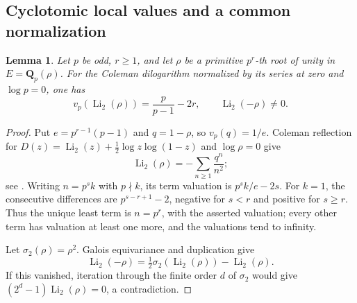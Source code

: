 \documentclass[11pt,a4paper]{amsart}
\numberwithin{equation}{section}
\newtheorem{lemma}[theorem]{Lemma}
\theoremstyle{definition}
\theoremstyle{remark}
\newcommand{\Q}{\mathbf Q}
\begin{document}
\subsection{Cyclotomic local values and a common normalization}
\label{d3:sec:cyclotomicnormalization}


\begin{lemma}\label{d3:lem:cyclotomicdilognonzero}
Let $p$ be odd, $r\geq1$, and let $\rho$ be a primitive $p^r$-th
root of unity in $E=\Q_p(\rho)$. For the Coleman dilogarithm
normalized by its series at zero and $\log p=0$, one has
\[
 v_p(\operatorname{Li}_2(\rho))
 =\frac p{p-1}-2r,\qquad
 \operatorname{Li}_2(-\rho)\ne0.
\]
\end{lemma}
\begin{proof}
Put $e=p^{r-1}(p-1)$ and $q=1-\rho$, so $v_p(q)=1/e$.
Coleman reflection for
$D(z)=\operatorname{Li}_2(z)+\frac12\log z\log(1-z)$
and $\log\rho=0$ give
\[
 \operatorname{Li}_2(\rho)
 =-\sum_{n\geq1}\frac{q^n}{n^2};
\]
see \cite[p.~377]{BesserDeJeuCurves}.
Writing $n=p^sk$ with $p\nmid k$, its term valuation is
$p^sk/e-2s$. For $k=1$, the consecutive differences are
$p^{s-r+1}-2$, negative for $s<r$ and positive for $s\geq r$.
Thus the unique least term is $n=p^r$, with the asserted
valuation; every other term has valuation at least one more,
and the valuations tend to infinity.

Let $\sigma_2(\rho)=\rho^2$. Galois equivariance and duplication
\cite[Remark~2.3 and equation~(2.4)]{BesserDeJeu} give
\[
 \operatorname{Li}_2(-\rho)
 =\tfrac12\sigma_2(\operatorname{Li}_2(\rho))
       -\operatorname{Li}_2(\rho).
\]
If this vanished, iteration through the finite order $d$ of
$\sigma_2$ would give
$(2^d-1)\operatorname{Li}_2(\rho)=0$, a contradiction.
\end{proof}
\end{document}
